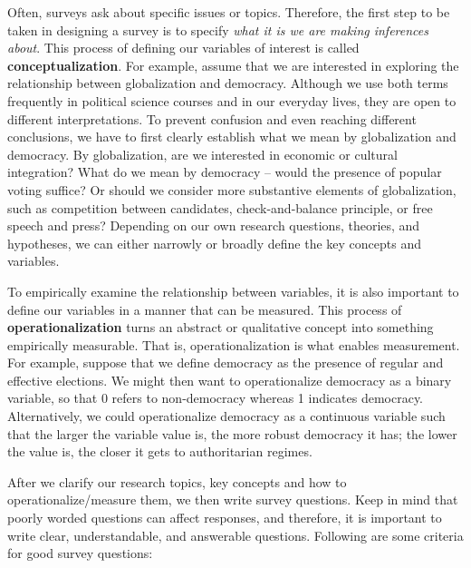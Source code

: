 \documentclass{book}
\begin{document}
Often, surveys ask about specific issues or topics. Therefore, the first step
to be taken in designing a survey is to specify \emph{what it is we are making
inferences about}. This process of defining our variables of interest is
called \textbf{conceptualization}. For example, assume that we are interested
in exploring the relationship between globalization and democracy. Although we
use both terms frequently in political science courses and in our everyday
lives, they are open to different interpretations. To prevent confusion and
even reaching different conclusions, we have to first clearly establish what
we mean by globalization and democracy. By globalization, are we interested in
economic or cultural integration? What do we mean by democracy -- would the
presence of popular voting suffice? Or should we consider more substantive
elements of globalization, such as competition between candidates,
check-and-balance principle, or free speech and press? Depending on our own
research questions, theories, and hypotheses, we can either narrowly or
broadly define the key concepts and variables.

To empirically examine the relationship between variables, it is also
important to define our variables in a manner that can be measured. This
process of \textbf{operationalization} turns an abstract or qualitative
concept into something empirically measurable. That is, operationalization is
what enables measurement. For example, suppose that we define democracy as the
presence of regular and effective elections. We might then want to
operationalize democracy as a binary variable, so that 0 refers to
non-democracy whereas 1 indicates democracy. Alternatively, we could
operationalize democracy as a continuous variable such that the larger the
variable value is, the more robust democracy it has; the lower the value is,
the closer it gets to authoritarian regimes.

After we clarify our research topics, key concepts and how to
operationalize/measure them, we then write survey questions. Keep in mind that
poorly worded questions can affect responses, and therefore, it is important
to write clear, understandable, and answerable questions. Following are some
criteria for good survey questions:
\end{document}
